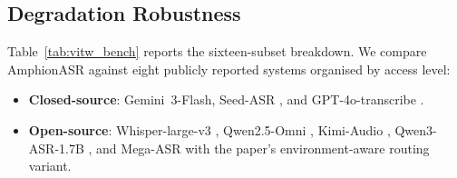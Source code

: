 \subsection{Degradation Robustness}
\label{sec:noise}

\label{subsec:vitw-results}

Table~\ref{tab:vitw_bench} reports the sixteen-subset breakdown.
We compare AmphionASR against eight publicly reported systems
organised by access level:

\begin{itemize}
  \item \textbf{Closed-source}: Gemini~3-Flash, Seed-ASR
        \cite{bai2024seedasr}, and GPT-4o-transcribe
        \cite{openai2024gpt4o}.
  \item \textbf{Open-source}: Whisper-large-v3
        \cite{radford2023whisper}, Qwen2.5-Omni
        \cite{xu2025qwen25omni}, Kimi-Audio
        \cite{kimiaudio2025}, Qwen3-ASR-1.7B
        \cite{qwen2025qwen3asr}, and Mega-ASR
        \cite{xie2026mega} with the paper's environment-aware
        routing variant.
\end{itemize}

